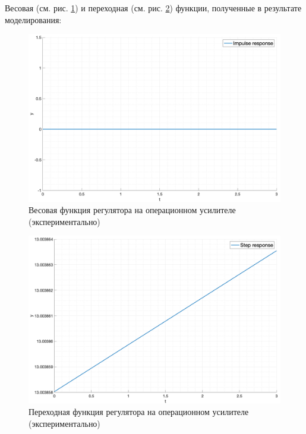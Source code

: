 Весовая (см. рис. \ref{fig:task5_impulse_response_exp}) и переходная (см. рис. \ref{fig:task5_step_response_exp}) функции, полученные в результате моделирования:
\begin{figure}[ht!]
    \centering
    \includegraphics[width=\textwidth]{media/plots/task5_impulse_response_exp.png}
    \caption{Весовая функция регулятора на операционном усилителе (экспериментально)}
    \label{fig:task5_impulse_response_exp}
\end{figure}
\begin{figure}[ht!]
    \centering
    \includegraphics[width=\textwidth]{media/plots/task5_step_response_exp.png}
    \caption{Переходная функция регулятора на операционном усилителе (экспериментально)}
    \label{fig:task5_step_response_exp}
\end{figure}

